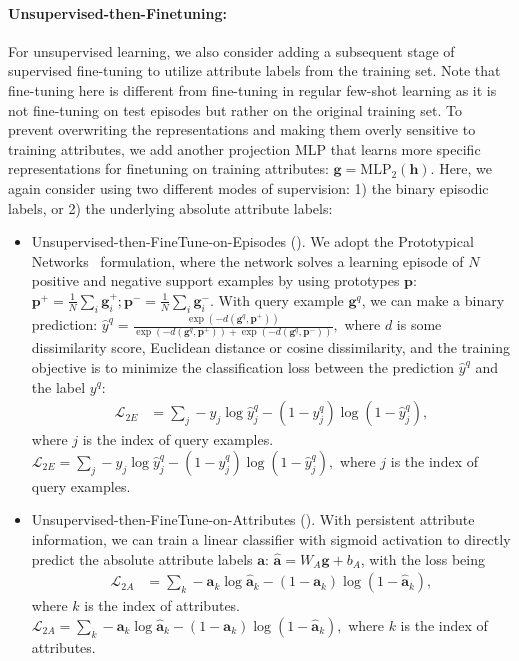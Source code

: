 \begin{itemize}
\savespacebeforesection
\paragraph{Unsupervised-then-Finetuning:} For unsupervised learning, we also
consider adding a subsequent stage of supervised fine-tuning to utilize
attribute labels from the training set. Note that fine-tuning here is different
from fine-tuning in regular few-shot learning as it is not fine-tuning on test
episodes but rather on the original training set. To prevent overwriting the
representations and making them overly sensitive to training attributes, we add
another projection MLP that learns more specific representations for finetuning
on training attributes: $\mathbf{g} = \mathrm{MLP}_2(\mathbf{h}).$ Here, we
again consider using two different modes of supervision: 1) the \taskname{}
binary episodic labels, or 2) the underlying absolute attribute labels:
\iflatexml
\begin{itemize}[leftmargin=*]
\else
\begin{itemize}
\fi
\savespacebeforesection
\item Unsupervised-then-FineTune-on-Episodes (\textbf{\uftpn}).
We adopt the
Prototypical Networks~\citep{protonet} formulation, where the network solves a
learning episode of $N$ positive and negative support examples by using
prototypes $\mathbf{p}$: $\mathbf{p}^+ = \frac{1}{N} \sum_i \mathbf{g}^+_i;
\mathbf{p}^- =
\frac{1}{N} \sum_i \mathbf{g}^-_i.$ With query example $\mathbf{g}^q$, we can
make a binary prediction:
$\hat{y}^q = \frac{\exp(-d(\mathbf{g}^q,
    \mathbf{p}^+))}{\exp(-d(\mathbf{g}^q, \mathbf{p}^+)) +
    \exp(-d(\mathbf{g}^q, \mathbf{p}^-))},$
where $d$ is some dissimilarity score, \eg Euclidean distance or cosine
dissimilarity, and the training objective is to minimize the classification
loss between the prediction $\hat{y}^q$ and the label $y^q$:
\ifarxiv
\begin{align}
\mathcal{L}_{2E} &= \sum_j - y_j \log \hat{y}^q_j - (1-y^q_j) \log (1 -
\hat{y}^q_j),
\end{align}
where $j$ is the index of query examples.
\else
$\mathcal{L}_{2E} = \sum_j - y_j \log \hat{y}^q_j - (1-y^q_j) \log (1 -
\hat{y}^q_j),$
where $j$ is the index of query examples.
\fi
    
\item Unsupervised-then-FineTune-on-Attributes (\textbf{\uftsa}). With
persistent attribute information, we can train a linear classifier with sigmoid
activation to directly predict the absolute attribute labels $\mathbf{a}$:
$\hat{\mathbf{a}} = W_A \mathbf{g} + b_A$, with the loss being
\ifarxiv
\begin{align}
\mathcal{L}_{2A} &= \sum_k - \mathbf{a}_k \log \hat{\mathbf{a}}_k -
(1-\mathbf{a}_k) \log (1 -
\hat{\mathbf{a}}_k),
\end{align}
\savespaceeqn
\vskip -0.6cm
where $k$ is the index of attributes.
\else
$\mathcal{L}_{2A} = \sum_k - \mathbf{a}_k \log \hat{\mathbf{a}}_k -
(1-\mathbf{a}_k) \log (1 -
\hat{\mathbf{a}}_k),$
where $k$ is the index of attributes.
\fi
\end{itemize}


\end{itemize}
\end{itemize}
